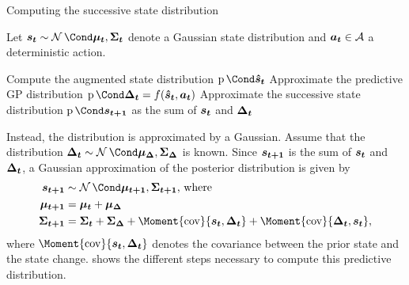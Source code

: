\begin{algorithm}[p]
    \caption{Computing the successive state distribution}
    \label{alg:linearization}
    Let $\rv{s_t} \sim \Gaussian{\mat{\mu_t}, \mat{\Sigma_t}}$ denote a Gaussian state distribution and $\bm{a_t} \in \mathcal{A}$ a deterministic action.
    \begin{algorithmic}[1]
        \State Compute the augmented state distribution $\Prob{\rv{\hat{s}_t}}$
        \State Approximate the predictive GP distribution $\Prob{\rv{\Delta_t}} = f(\rv{\hat{s}_t}, \mat{a_t})$
        \State Approximate the successive state distribution $\Prob{\rv{s_{t+1}}}$ as the sum of $\bm{s_t}$ and $\bm{\Delta_t}$
    \end{algorithmic}
\end{algorithm}
Instead, the distribution is approximated by a Gaussian.
Assume that the distribution $\rv{\Delta_t} \sim \Gaussian{\mat{\mu_\Delta}, \mat{\Sigma_\Delta}}$ is known.
Since $\bm{s_{t+1}}$ is the sum of $\bm{s_t}$ and $\bm{\Delta_t}$, a Gaussian approximation of the posterior distribution is given by
\begin{align}
    \rv{s_{t+1}} &\sim \Gaussian{\mat{\mu_{t+1}}, \mat{\Sigma_{t+1}}} \text{, where} \\
    \mat{\mu_{t+1}} &= \mat{\mu_t} + \mat{\mu_\Delta} \\
    \mat{\Sigma_{t+1}} &= \mat{\Sigma_t} + \mat{\Sigma_\Delta} + \Moment{\cov}{\rv{s_t}, \rv{\Delta_t}} + \Moment{\cov}{\rv{\Delta_t}, \rv{s_t}},
\end{align}
where $\Moment{\cov}{\rv{s_t}, \rv{\Delta_t}}$ denotes the covariance between the prior state and the state change.
 shows the different steps necessary to compute this predictive distribution.


